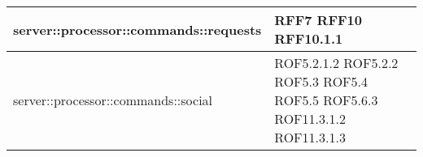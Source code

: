 \begin{center}
\begin{longtable}{| p{9cm} | p{4cm} |}
\hline
server::processor::commands::requests  & RFF7 \newline RFF10 \newline RFF10.1.1 \\
\hline
server::processor::commands::social  &  ROF5.2.1.2 \newline ROF5.2.2 \newline ROF5.3 \newline ROF5.4 \newline ROF5.5 \newline ROF5.6.3 \newline ROF11.3.1.2 \newline ROF11.3.1.3 \\
\hline

\end{longtable}
\egroup
\end{center}
